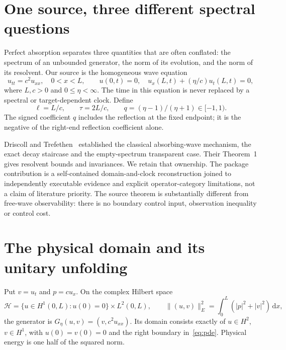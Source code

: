 \documentclass[10pt]{article}
\newcommand{\dd}{\,\mathrm d}
\begin{document}
\section{One source, three different spectral questions}
Perfect absorption separates three quantities that are often conflated:
the spectrum of an unbounded generator, the norm of its evolution, and the
norm of its resolvent. Our source is the homogeneous wave equation
\begin{equation}
 u_{tt}=c^2u_{xx},\quad 0<x<L,\qquad
 u(0,t)=0,\quad u_x(L,t)+(\eta/c)u_t(L,t)=0,
 \label{eq:pde}
\end{equation}
where $L,c>0$ and $0\leq\eta<\infty$. The time in this equation is never
replaced by a spectral or target-dependent clock. Define
\begin{equation}
 \ell=L/c,\qquad \tau=2L/c,\qquad q=(\eta-1)/(\eta+1)\in[-1,1).
 \label{eq:q}
\end{equation}
The signed coefficient $q$ includes the reflection at the fixed endpoint;
it is the negative of the right-end reflection coefficient alone.

Driscoll and Trefethen~\cite{driscoll1996} established the classical
absorbing-wave mechanism, the exact decay staircase and the empty-spectrum
transparent case. Their Theorem~1 gives resolvent bounds and invariances.
We retain that ownership. The package contribution is a self-contained
domain-and-clock reconstruction joined to independently executable evidence
and explicit operator-category limitations, not a claim of literature priority.
The source theorem is substantially different from free-wave observability:
there is no boundary control input, observation inequality or control cost.

\section{The physical domain and its unitary unfolding}
Put $v=u_t$ and $p=cu_x$. On the complex Hilbert space
\begin{equation}
 \mathcal H=\{u\in H^1(0,L):u(0)=0\}\times L^2(0,L),\qquad
 \|(u,v)\|_E^2=\int_0^L(|p|^2+|v|^2)\dd x,
\end{equation}
the generator is $G_\eta(u,v)=(v,c^2u_{xx})$. Its domain consists exactly
of $u\in H^2$, $v\in H^1$, with $u(0)=v(0)=0$ and the right boundary
in~\eqref{eq:pde}. Physical energy is one half of the squared norm.
\end{document}
